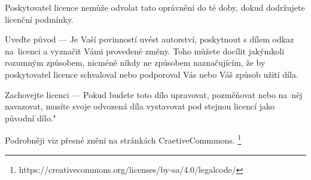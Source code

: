 Poskytovatel licence nemůže odvolat tato oprávnění do té doby, dokud dodržujete licenční podmínky.

Uveďte původ — Je Vaší povinností uvést autorství, poskytnout s dílem odkaz
na~licenci a vyznačit Vámi provedené změny. Toho můžete docílit jakýmkoli
rozumným způsobem, nicméně nikdy ne způsobem naznačujícím, že by poskytovatel
licence schvaloval nebo podporoval Vás nebo Váš způsob užití díla.

Zachovejte licenci — Pokud budete toto dílo upravovat, pozměňovat nebo
na~něj navazovat, musíte svoje odvozená díla vystavovat pod stejnou
licencí jako původní dílo."

Podrobněji viz přesné znění na stránkách CraetiveCommmons.
\footnote{https://creativecommons.org/licenses/by-sa/4.0/legalcode/}
